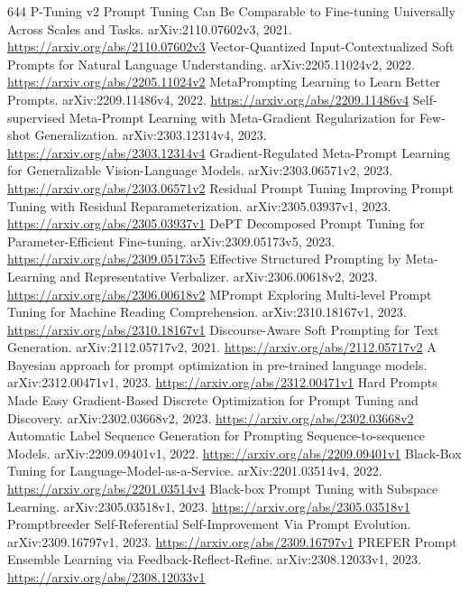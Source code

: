 \documentclass[11pt]{article}
\begin{document}
\begin{thebibliography}{644}
 P-Tuning v2 Prompt Tuning Can Be Comparable to Fine-tuning Universally Across Scales and Tasks. arXiv:2110.07602v3, 2021. \url{https://arxiv.org/abs/2110.07602v3}
 Vector-Quantized Input-Contextualized Soft Prompts for Natural Language Understanding. arXiv:2205.11024v2, 2022. \url{https://arxiv.org/abs/2205.11024v2}
 MetaPrompting Learning to Learn Better Prompts. arXiv:2209.11486v4, 2022. \url{https://arxiv.org/abs/2209.11486v4}
 Self-supervised Meta-Prompt Learning with Meta-Gradient Regularization for Few-shot Generalization. arXiv:2303.12314v4, 2023. \url{https://arxiv.org/abs/2303.12314v4}
 Gradient-Regulated Meta-Prompt Learning for Generalizable Vision-Language Models. arXiv:2303.06571v2, 2023. \url{https://arxiv.org/abs/2303.06571v2}
 Residual Prompt Tuning Improving Prompt Tuning with Residual Reparameterization. arXiv:2305.03937v1, 2023. \url{https://arxiv.org/abs/2305.03937v1}
 DePT Decomposed Prompt Tuning for Parameter-Efficient Fine-tuning. arXiv:2309.05173v5, 2023. \url{https://arxiv.org/abs/2309.05173v5}
 Effective Structured Prompting by Meta-Learning and Representative Verbalizer. arXiv:2306.00618v2, 2023. \url{https://arxiv.org/abs/2306.00618v2}
 MPrompt Exploring Multi-level Prompt Tuning for Machine Reading Comprehension. arXiv:2310.18167v1, 2023. \url{https://arxiv.org/abs/2310.18167v1}
 Discourse-Aware Soft Prompting for Text Generation. arXiv:2112.05717v2, 2021. \url{https://arxiv.org/abs/2112.05717v2}
 A Bayesian approach for prompt optimization in pre-trained language models. arXiv:2312.00471v1, 2023. \url{https://arxiv.org/abs/2312.00471v1}
 Hard Prompts Made Easy Gradient-Based Discrete Optimization for Prompt Tuning and Discovery. arXiv:2302.03668v2, 2023. \url{https://arxiv.org/abs/2302.03668v2}
 Automatic Label Sequence Generation for Prompting Sequence-to-sequence Models. arXiv:2209.09401v1, 2022. \url{https://arxiv.org/abs/2209.09401v1}
 Black-Box Tuning for Language-Model-as-a-Service. arXiv:2201.03514v4, 2022. \url{https://arxiv.org/abs/2201.03514v4}
 Black-box Prompt Tuning with Subspace Learning. arXiv:2305.03518v1, 2023. \url{https://arxiv.org/abs/2305.03518v1}
 Promptbreeder Self-Referential Self-Improvement Via Prompt Evolution. arXiv:2309.16797v1, 2023. \url{https://arxiv.org/abs/2309.16797v1}
 PREFER Prompt Ensemble Learning via Feedback-Reflect-Refine. arXiv:2308.12033v1, 2023. \url{https://arxiv.org/abs/2308.12033v1}

\end{thebibliography}
\end{document}
